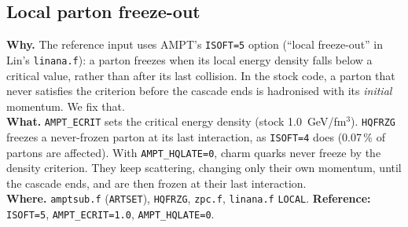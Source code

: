 \documentclass[11pt,a4paper]{article}
\newcommand{\sw}[1]{\texttt{#1}}
\newcommand{\code}[1]{\texttt{#1}}
\begin{document}
\subsection{Local parton freeze-out}
\textbf{Why.} The reference input uses AMPT's \code{ISOFT=5} option (``local freeze-out'' in Lin's \code{linana.f}): a
parton freezes when its local energy density falls below a critical value, rather than after its last collision. In
the stock code, a parton that never satisfies the criterion before the cascade ends is hadronised with its
\emph{initial} momentum. We fix that.\\
\textbf{What.} \sw{AMPT\_ECRIT} sets the critical energy density (stock 1.0~GeV/fm$^3$). \code{HQFRZG} freezes a
never-frozen parton at its last interaction, as \code{ISOFT=4} does (0.07\,\% of partons are affected). With
\sw{AMPT\_HQLATE=0}, charm quarks never freeze by the density criterion. They keep scattering, changing only their own
momentum, until the cascade ends, and are then frozen at their last interaction.\\
\textbf{Where.} \code{amptsub.f} (\code{ARTSET}), \code{HQFRZG}, \code{zpc.f}, \code{linana.f} \code{LOCAL}.
\textbf{Reference:} \code{ISOFT=5}, \sw{AMPT\_ECRIT=1.0}, \sw{AMPT\_HQLATE=0}.
\end{document}
